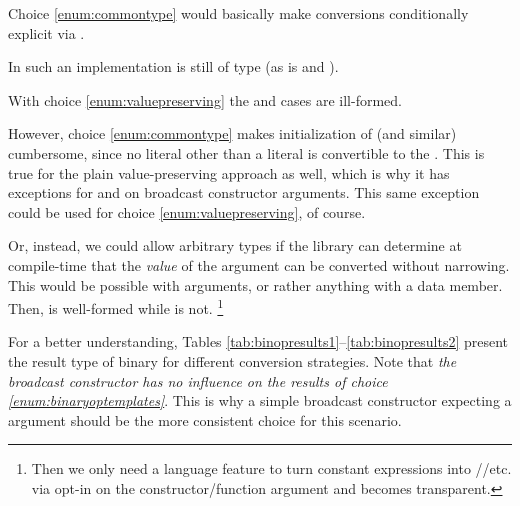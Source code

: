 Choice \ref{enum:commontype} would basically make conversions conditionally
explicit via .

In such an implementation  is still of type
 (as is  and ).

With choice \ref{enum:valuepreserving} the  and
 cases are ill-formed.

However, choice \ref{enum:commontype} makes initialization of
 (and similar) cumbersome, since no literal other than a
 literal is convertible to the \simd.
This is true for the plain value-preserving approach as well, which is why it
has exceptions for  and  on broadcast constructor
arguments.
This same exception could be used for choice \ref{enum:valuepreserving}, of
course.

Or, instead, we could allow arbitrary types if the library can determine at
compile-time that the \emph{value} of the argument can be converted without
narrowing.
This would be possible with  arguments, or rather
anything with a  data member.
Then, \std{} is well-formed while
\std{} is not.%
\footnote{Then we only need a language feature to turn constant expressions
into //etc. via opt-in on the
constructor/function argument and \std{} becomes transparent.}

For a better understanding, Tables
\ref{tab:binopresults1}--\ref{tab:binopresults2} present the result type of
binary  for different conversion strategies.
Note that \emph{the broadcast constructor has no influence on the results of
choice \ref{enum:binaryoptemplates}}.
This is why a simple broadcast constructor expecting a 
argument should be the more consistent choice for this scenario.

